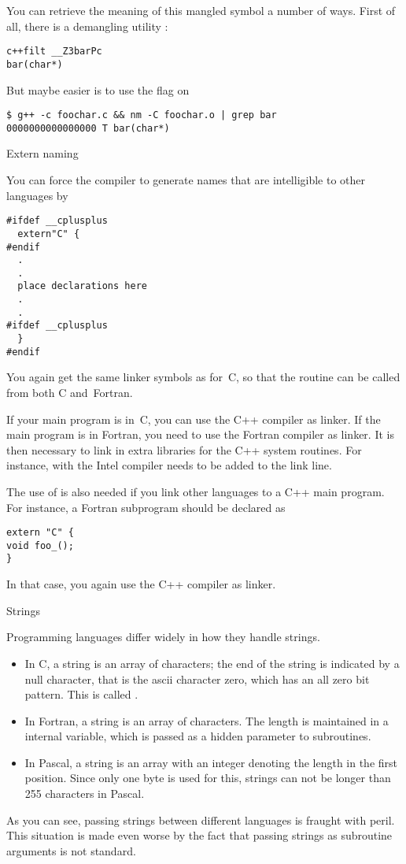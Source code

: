 You can retrieve the meaning of this mangled symbol a number of ways.
First of all, there is a demangling utility :
\begin{verbatim}
c++filt __Z3barPc
bar(char*)
\end{verbatim}

But maybe easier is to use the  flag on 
\begin{verbatim}
$ g++ -c foochar.c && nm -C foochar.o | grep bar
0000000000000000 T bar(char*)
\end{verbatim}

 {Extern naming}

You can force the compiler to
generate names that are intelligible to other languages by
\begin{verbatim}
#ifdef __cplusplus
  extern"C" {
#endif
  .
  .
  place declarations here
  .
  .
#ifdef __cplusplus
  }
#endif
\end{verbatim}

You again get the same linker symbols as for~C, so that the routine
can be called from both C and~Fortran.

If your main program is in~C, you can use the C++ compiler as linker.
If the main program is in Fortran, you need to use the Fortran
compiler as linker. It is then necessary to link in extra
libraries for the C++ system routines. For instance, with the 
Intel compiler  needs to be added to the link line.

The use of  is also needed if you link other languages to a
C++ main program. For instance, a Fortran subprogram  should be
declared as
\begin{verbatim}
extern "C" {
void foo_();
}
\end{verbatim}
In that case, you again use the C++ compiler as linker.


 {Strings}

Programming languages differ widely in how they handle strings. 
\begin{itemize}
\item In C, a string is an array of characters; the end of the string
  is indicated by a null character, that is the ascii character zero,
  which has an all zero bit pattern. This is called .
\item In Fortran, a string is an array of characters. The length is
  maintained in a internal variable, which is passed as a hidden
  parameter to subroutines.
\item In Pascal, a string is an array with an integer denoting the
  length in the first position. Since only one byte is used for this,
  strings can not be longer than 255 characters in Pascal.
\end{itemize}
As you can see, passing strings between different languages is fraught
with peril. This situation is made even worse by the fact that passing
strings as subroutine arguments is not standard.

